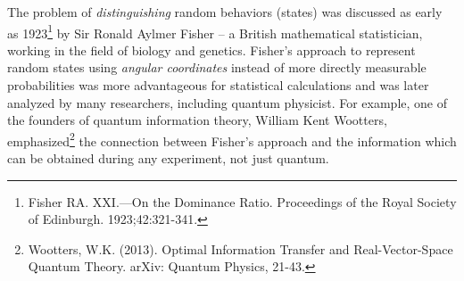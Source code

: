 The problem of \emph{distinguishing} random behaviors (states) was discussed as early as 1923\footnote{Fisher RA. XXI.—On the Dominance Ratio. Proceedings of the Royal Society of Edinburgh. 1923;42:321-341.} by Sir Ronald Aylmer Fisher -- a British mathematical statistician, working in the field of biology and genetics. Fisher's approach to represent random states using \emph{angular coordinates} instead of more directly measurable probabilities was more advantageous for statistical calculations and was later analyzed by many researchers, including quantum physicist. For example, one of the founders of quantum information theory, William Kent Wootters, emphasized\footnote{Wootters, W.K. (2013). Optimal Information Transfer and Real-Vector-Space Quantum Theory. arXiv: Quantum Physics, 21-43.} the connection between Fisher's approach and the information which can be obtained during any experiment, not just quantum.
